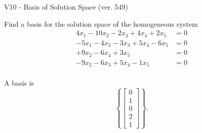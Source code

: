 \begin{exercise}
  \begin{exerciseTitle}V10 - Basis of Solution Space (ver. 549)\end{exerciseTitle}
  \begin{exerciseStatement}
    Find a basis for the solution space of the homogeneous system 
\begin{align*}
 4 x_ 1 -10 x_ 2 -2 x_ 3 + 4 x_ 4 + 2 x_ 5 &= 0  \\ 
  -5 x_ 1 -4 x_ 2 -3 x_ 3 + 5 x_ 4 -6 x_ 5 &= 0  \\ 
  + 9 x_ 2 -6 x_ 4 + 3 x_ 5 &= 0  \\ 
  -9 x_ 2 -6 x_ 3 + 5 x_ 4 -1 x_ 5 &= 0  \\ 
 \end{align*}


 
  \end{exerciseStatement}

  \begin{exerciseAnswer}
   A basis is   
\[\left\{\left[\begin{array}{c}
0 \\
1 \\
0 \\
2 \\
1
\end{array}\right]\right\}.\]

  


  \end{exerciseAnswer}
\end{exercise}